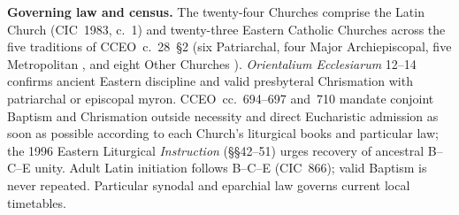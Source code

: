 \begin{landscape}
\vspace{0.10em}
{\fontsize{5.55}{6.00}\selectfont\noindent
\textbf{Governing law and census.} The twenty-four Churches  comprise the Latin Church (CIC~1983, c.~1) and twenty-three Eastern Catholic Churches across the five traditions of CCEO~c.~28~\S2 (six Patriarchal, four Major Archiepiscopal, five Metropolitan , and eight Other Churches ). \emph{Orientalium Ecclesiarum} 12--14 confirms ancient Eastern discipline and valid presbyteral Chrismation with patriarchal or episcopal myron. CCEO~cc.~694--697 and~710 mandate conjoint Baptism and Chrismation outside necessity and direct Eucharistic admission as soon as possible according to each Church's liturgical books and particular law; the 1996 Eastern Liturgical \emph{Instruction} (\S\S42--51) urges recovery of ancestral B--C--E unity. Adult Latin initiation follows B--C--E (CIC~866); valid Baptism is never repeated. Particular synodal and eparchial law governs current local timetables.}
\churchesInitiationEndHook
\end{landscape}

